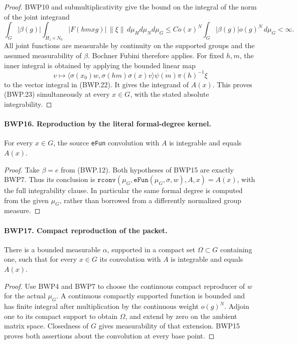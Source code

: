 \begin{proof}
BWP10 and submultiplicativity give the bound on the integral of the
norm of the joint integrand
\[
 \int_G |\beta(g)|
 \int_{H_z\times N_0}|F(hmxg)|\,\|\xi\|\,d\mu_Hd\mu_Nd\mu_G
 \le C o(x)^N\int_G|\beta(g)|o(g)^N\,d\mu_G<\infty.
\]
All joint functions are measurable by continuity on the supported
groups and the assumed measurability of \(\beta\).
Bochner Fubini therefore applies.  For fixed \(h,m\), the inner
integral is obtained by applying the bounded linear map
\[
 v\longmapsto
 \langle\sigma(x_0)w,\sigma(hm)\sigma(x)v\rangle
 \overline{\psi(m)}\pi(h)^{-1}\xi
\]
to the vector integral in (BWP.22).  It gives the integrand of
\(A(x)\).  This proves (BWP.23) simultaneously at every
\(x\in G\), with the stated absolute integrability.
\end{proof}

\paragraph{BWP16. Reproduction by the literal formal-degree kernel.}
\label{claim:BWP16}
For every \(x\in G\), the source \texttt{eFun} convolution
with \(A\) is integrable and equals \(A(x)\).

\begin{proof}
Take \(\beta=e\) from (BWP.12).  Both hypotheses of BWP15
are exactly BWP7.  Thus its conclusion is
\(\texttt{rconv}(\mu_G,\texttt{eFun}(\mu_G,\sigma,w),A,x)=A(x)\),
with the full integrability clause.  In particular the same formal
degree is computed from the given \(\mu_G\), rather than borrowed
from a differently normalized group measure.
\end{proof}

\paragraph{BWP17. Compact reproduction of the packet.}
\label{claim:BWP17}
There is a bounded measurable \(\alpha\), supported in a compact
set \(\Omega\subset G\) containing one, such that for every
\(x\in G\) its convolution with \(A\) is integrable and
equals \(A(x)\).

\begin{proof}
Use BWP4 and BWP7 to choose the continuous compact reproducer of
\(w\) for the actual \(\mu_G\).  A continuous compactly supported
function is bounded and has finite integral after multiplication by
the continuous weight \(o(g)^N\).  Adjoin one to its compact support
to obtain \(\Omega\), and extend by zero on the ambient matrix
space.  Closedness of \(G\) gives measurability of that extension.
BWP15 proves both assertions about the convolution at every base point.
\end{proof}

